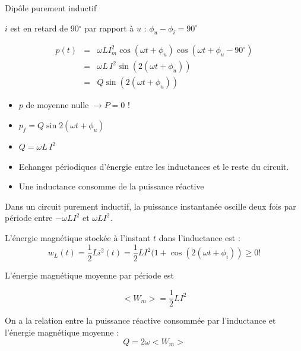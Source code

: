 	

	\begin{frame}{Dipôle purement inductif}
		
		$i$ est en retard de 90$^{\circ}$ par rapport à $u$ :
		$\phi_u-\phi_i=90^{\circ}$
		
		\begin{eqnarray*}
			p(t)& =& \omega L I_m^2 \cos(\omega t+\phi_u)\cos (\omega
			t+\phi_u - 90^{\circ})\\
			& = & \omega L\, I^2 \sin (2(\omega t + \phi_u))\\
			& = & Q \sin (2(\omega t + \phi_u))
		\end{eqnarray*}
		
		\begin{itemize}
		\item $p$ de moyenne nulle $\rightarrow P=0$ !\\
		\item $p_f= Q \sin 2(\omega t+ \phi_u)$
		\item $Q=\omega L\, I^2$
		\item Echanges périodiques d'énergie entre les inductances et le reste du circuit.
		\item Une inductance consomme de la puissance réactive  
		\end{itemize}
	\end{frame}
	
	
	\begin{frame}{}
		Dans un circuit purement inductif, la puissance instantanée oscille
		deux fois par période entre $-\omega L I^2$ et $\omega L I^2$.
		
		L'énergie magnétique stockée à l'instant $t$ dans l'inductance est :
		\[w_L(t)= \frac{1}{2}Li^2(t)=\frac{1}{2} L I^2(1+\cos (2(\omega
		t + \phi_i)) \geq 0 !\]
		
		L'énergie magnétique moyenne par période est
		
		\[<W_m>=\frac{1}{2}LI^2\]
		
		On a la relation entre la puissance réactive consommée par
		l'inductance et l'énergie magnétique
		moyenne : 
		\[ Q = 2\omega <W_m>\]
	\end{frame}
	
	
